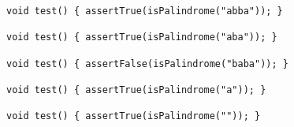 
\begin{minipage}{12cm}
\begin{lstlisting}[style=CStyle, caption=Example of a Test Suite for the function \texttt{isPalindrome}., label=isPalindrome_TS]
void test() { assertTrue(isPalindrome("abba")); }

void test() { assertTrue(isPalindrome("aba")); }

void test() { assertFalse(isPalindrome("baba")); }

void test() { assertTrue(isPalindrome("a")); }

void test() { assertTrue(isPalindrome("")); }
\end{lstlisting}
\end{minipage}